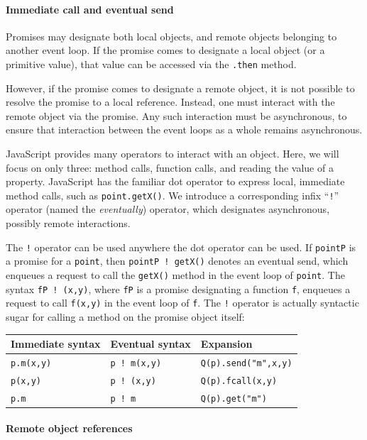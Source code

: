 \documentclass{llncs}
\begin{document}
\paragraph{Immediate call and eventual send}

Promises may designate both local objects, and remote objects belonging to another event loop. If the promise comes to designate a local object (or a primitive value), that value can be accessed via the {\tt .then} method.

However, if the promise comes to designate a remote object, it is not possible to resolve the promise to a local reference. Instead, one must interact with the remote object via the promise. Any such interaction must be asynchronous, to ensure that interaction between the event loops as a whole remains asynchronous.

JavaScript provides many operators to interact with an object. Here, we will focus on only three: method calls, function calls, and reading the value of a property. JavaScript has the familiar dot operator to express local, immediate method calls, such as {\tt point.getX()}. We introduce a corresponding infix ``{\tt !}'' operator (named the \emph{eventually}) operator, which designates asynchronous, possibly remote interactions.

The {\tt !} operator can be used anywhere the dot operator can be used. If {\tt pointP} is a promise for a {\tt point}, then {\tt pointP ! getX()} denotes an eventual send, which enqueues a request to call the {\tt getX()} method in the event loop of {\tt point}. The syntax {\tt fP ! (x,y)}, where {\tt fP} is a promise designating a function {\tt f}, enqueues a request to call {\tt f(x,y)} in the event loop of {\tt f}. The {\tt !} operator is actually syntactic sugar for calling a method on the promise object itself:

\begin{center}
  \begin{tabular}{ l | l | l }
  Immediate syntax & Eventual syntax & Expansion \\
  \hline
  {\tt p.m(x,y)} & {\tt p ! m(x,y)} & {\tt Q(p).send("m",x,y)} \\
  {\tt p(x,y)} & {\tt p ! (x,y)} & {\tt Q(p).fcall(x,y)}\\
  {\tt p.m} & {\tt p ! m} & {\tt Q(p).get("m")}\\
  \end{tabular} 
\end{center}


\paragraph{Remote object references}
\end{document}

